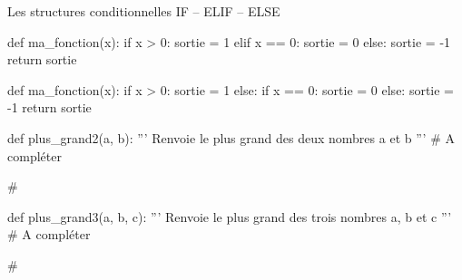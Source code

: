 \begin{easybox}{Les structures conditionnelles IF -- ELIF -- ELSE}{}
\begin{minipage}{0.38\linewidth}
		
		\begin{CodePythontexAlt}[Largeur=1\linewidth,Centre,Lignes=true,PremLigne=1]{}
			def ma_fonction(x):
				if x > 0:	
					sortie = 1
				elif x == 0:
					sortie = 0
				else:
					sortie = -1
				return sortie
			\end{CodePythontexAlt}
	
			\begin{CodePythontexAlt}[Largeur=1\linewidth,Centre,Lignes=true,PremLigne=1]{}
				def ma_fonction(x):
					if x > 0:	
						sortie = 1
					else:
						if x == 0:
							sortie = 0
						else:
							sortie = -1
					return sortie
				\end{CodePythontexAlt}
	\end{minipage}
	
	
	\end{easybox}
	
	\begin{exercice_cours}{}
	
        \begin{minipage}{0.48\linewidth}
            \begin{CodePythontexAlt}[Largeur=1\linewidth,Centre,Lignes=false,PremLigne=1]{}
def plus_grand2(a, b):
    ''' Renvoie le plus grand des 
    deux nombres a et b '''
	# A compléter












    #
	\end{CodePythontexAlt}
        \end{minipage}\hfill{}
        \begin{minipage}{0.48\linewidth}
            \begin{CodePythontexAlt}[Largeur=1\linewidth,Centre,Lignes=false,PremLigne=1]{}
def plus_grand3(a, b, c):
    ''' Renvoie le plus grand des 
    trois nombres a, b et c '''
    # A compléter
            




	






    #
		\end{CodePythontexAlt}
        \end{minipage}
        
	
	
	
		
	
	
	\end{exercice_cours}	
